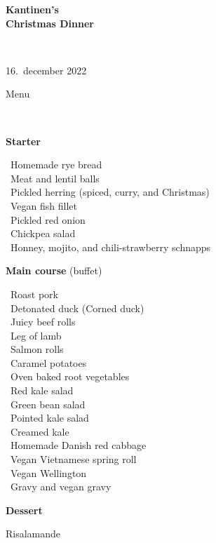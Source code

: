 \begin{center}
\begin{HUGE}
\textbf{Kantinen's \\[3mm] Christmas Dinner}
\end{HUGE}
\\[.6cm]
\begin{Large}
16.~december 2022
\end{Large}
\end{center}
\vspace*{.01cm}
\begin{center}
\begin{huge}
Menu
\end{huge}
\\[.1cm]
\end{center}
\newcommand{\course}[1]{\vspace*{4mm} \textbf{#1} \vspace{-7mm}}
\newcommand{\goodindent}{\null\hspace{23mm}}
{\small
\vspace{-0.5cm}
\begin{center}
\course{Starter}
\end{center}
  \goodindent~Homemade rye bread
\\\goodindent~Meat and lentil balls
\\\goodindent~Pickled herring (spiced, curry, and Christmas)
\\\goodindent~Vegan fish fillet
\\\goodindent~Pickled red onion
\\\goodindent~Chickpea salad
\\\goodindent~Honney, mojito, and chili-strawberry schnapps

\begin{center}
\vspace{-0.2cm}
\course{Main course} (buffet)
\end{center}
  \goodindent~Roast pork
\\\goodindent~Detonated duck (Corned duck)
\\\goodindent~Juicy beef rolls
\\\goodindent~Leg of lamb
\\\goodindent~Salmon rolls
\\\goodindent~Caramel potatoes
\\\goodindent~Oven baked root vegetables
\\\goodindent~Red kale salad
\\\goodindent~Green bean salad
\\\goodindent~Pointed kale salad
\\\goodindent~Creamed kale
\\\goodindent~Homemade Danish red cabbage
\\\goodindent~Vegan Vietnamese spring roll
\\\goodindent~Vegan Wellington
\\\goodindent~Gravy and vegan gravy

\begin{center}
\vspace{-0.2cm}
\course{Dessert}
\end{center}
  \goodindent Risalamande
}
